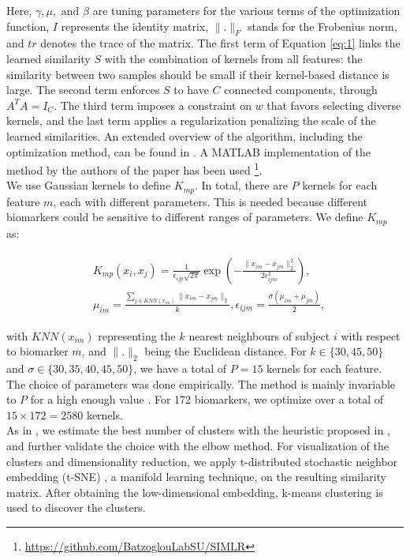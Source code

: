 Here, $\gamma, \mu, \text{ and } \beta$ are tuning parameters for the various terms of the optimization function, $I$ represents the identity matrix, $\| . \|_F$ stands for the Frobenius norm, and $tr$ denotes the trace of the matrix. The first term of Equation \ref{eq:1} links the learned similarity $S$ with the combination of kernels from all features: the similarity between two samples should be small if their kernel-based distance is large. The second term enforces $S$ to have $C$ connected components, through $A^TA = I_C$. The third term imposes a constraint on $w$ that favors selecting diverse kernels, and the last term applies a regularization penalizing the scale of the learned similarities. An extended overview of the algorithm, including the optimization method, can be found in \cite{Ramazzotti2018}. A MATLAB implementation of the method by the authors of the paper has been used \footnote{\url{https://github.com/BatzoglouLabSU/SIMLR}}. \\

We use Gaussian kernels to define $K_{mp}$. In total, there are $P$ kernels for each feature $m$, each with different parameters. This is needed because different biomarkers could be sensitive to different ranges of parameters. We define $K_{mp}$ as:

\begin{align}
\begin{split}\label{eq:2}
{}&K_{mp}(x_i,x_j) = \frac{1}{\epsilon_{ijp}\sqrt{2\pi}} \exp \left( -\frac{\| x_{im} - x_{jm} \|^2_2}{2\epsilon_{ijm}^2}  \right), \\
{}&\mu_{im} = \frac{\sum_{j \in KNN(x_{im})} \| x_{im} - x_{jm} \|_2}{k}, \epsilon_{ijm}=\frac{\sigma(\mu_{im} + \mu_{jm})}{2},
\end{split}
\end{align}

with $KNN(x_{im})$ representing the $k$ nearest neighbours of subject $i$ with respect to biomarker $m$, and $\| .\|_2$ being the Euclidean distance. For $k\in \{30,45,50\}$ and $\sigma \in \{30,35,40,45,50\}$, we have a total of $P=15$ kernels for each feature. The choice of parameters was done empirically. The method is mainly invariable to $P$ for a high enough value \cite{Wang2017a}. For 172 biomarkers, we optimize over a total of $15\times 172=2580$ kernels. \\

As in \cite{Ramazzotti2018}, we estimate the best number of clusters with the heuristic proposed in \cite{Zelnik-Manor}, and further validate the choice with the elbow method. For visualization of the clusters and dimensionality reduction, we apply t-distributed stochastic neighbor embedding (t-SNE) \cite{VanDerMaaten2008}, a manifold learning technique, on the resulting similarity matrix. After obtaining the low-dimensional embedding, k-means clustering is used to discover the clusters. \\

